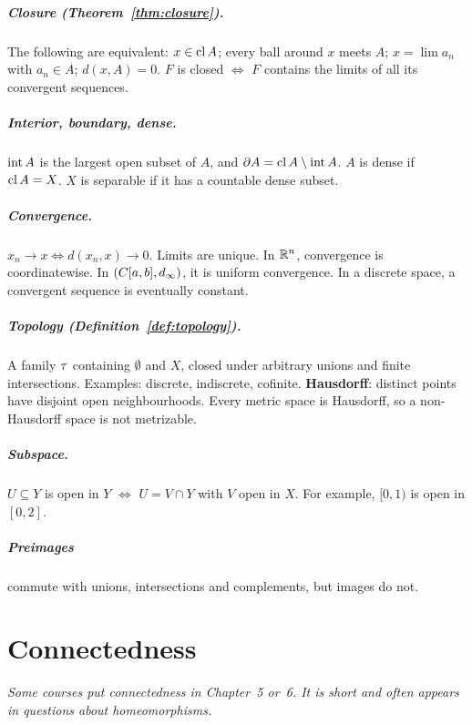\paragraph{Closure (Theorem~\ref{thm:closure}).} The following are equivalent: $x\in\operatorname{cl} A$; every ball around $x$ meets $A$; $x=\lim a_n$ with $a_n\in A$; $d(x,A)=0$. $F$ is closed $\iff$ $F$ contains the limits of all its convergent sequences.

\paragraph{Interior, boundary, dense.} $\operatorname{int} A$ is the largest open subset of $A$, and $\partial A=\operatorname{cl} A\setminus\operatorname{int} A$. $A$ is dense if $\operatorname{cl} A=X$. $X$ is separable if it has a countable dense subset.

\paragraph{Convergence.} $x_n\to x\iff d(x_n,x)\to0$. Limits are unique. In $\mathbb{R}^n$, convergence is coordinatewise. In $(C[a,b],d_\infty)$, it is uniform convergence. In a discrete space, a convergent sequence is eventually constant.

\paragraph{Topology (Definition~\ref{def:topology}).} A family $\tau$ containing $\emptyset$ and $X$, closed under arbitrary unions and finite intersections. Examples: discrete, indiscrete, cofinite. \textbf{Hausdorff}: distinct points have disjoint open neighbourhoods. Every metric space is Hausdorff, so a non-Hausdorff space is not metrizable.

\paragraph{Subspace.} $U\subseteq Y$ is open in $Y$ $\iff$ $U=V\cap Y$ with $V$ open in $X$. For example, $[0,1)$ is open in $[0,2]$.

\paragraph{Preimages} commute with unions, intersections and complements, but images do not.
\fi

\chapter{Connectedness}\label{app:connected}
{\small\itshape Some courses put connectedness in Chapter~5 or~6. It is short and often appears in questions about homeomorphisms.}


